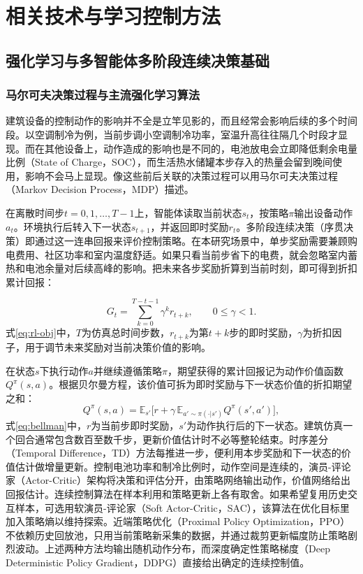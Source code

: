 \chapter{相关技术与学习控制方法}

\section{强化学习与多智能体多阶段连续决策基础}
\subsection{马尔可夫决策过程与主流强化学习算法}
建筑设备的控制动作的影响并不全是立竿见影的，而且经常会影响后续的多个时间段。以空调制冷为例，当前步调小空调制冷功率，室温升高往往隔几个时段才显现。而在其他设备上，动作造成的影响也是不同的，电池放电会立即降低剩余电量比例（State of Charge，SOC），而生活热水储罐本步存入的热量会留到晚间使用，影响不会马上显现。像这些前后关联的决策过程可以用马尔可夫决策过程（Markov Decision Process，MDP）描述\cite{sutton2018}。

在离散时间步$t=0,1,\dots,T-1$上，智能体读取当前状态$s_t$，按策略$\pi$输出设备动作$a_t$。环境执行后转入下一状态$s_{t+1}$，并返回即时奖励$r_t$。多阶段连续决策（序贯决策）即通过这一连串回报来评价控制策略\cite{powell2022}。在本研究场景中，单步奖励需要兼顾购电费用、社区功率和室内温度舒适。如果只看当前步省下的电费，就会忽略室内蓄热和电池余量对后续高峰的影响。把未来各步奖励折算到当前时刻，即可得到折扣累计回报：

\begin{equation}
    \label{eq:rl-obj}
    G_t=\sum_{k=0}^{T-t-1}\gamma^k r_{t+k},\qquad 0\leq\gamma<1 .
\end{equation}
式\eqref{eq:rl-obj}中，$T$为仿真总时间步数，$r_{t+k}$为第$t+k$步的即时奖励，$\gamma$为折扣因子，用于调节未来奖励对当前决策价值的影响。

在状态$s$下执行动作$a$并继续遵循策略$\pi$，期望获得的累计回报记为动作价值函数$Q^{\pi}(s,a)$。根据贝尔曼方程，该价值可拆为即时奖励与下一状态价值的折扣期望之和：
\begin{equation}
    \label{eq:bellman}
    Q^{\pi}(s,a)=\mathbb{E}_{s'}\Big[r+\gamma\,\mathbb{E}_{a'\sim\pi(\cdot|s')}Q^{\pi}(s',a')\Big],
\end{equation}
式\eqref{eq:bellman}中，$r$为当前步即时奖励，$s'$为动作执行后的下一状态。建筑仿真一个回合通常包含数百至数千步，更新价值估计时不必等整轮结束。时序差分（Temporal Difference，TD）方法每推进一步，便利用本步奖励和下一状态的价值估计做增量更新。控制电池功率和制冷比例时，动作空间是连续的，演员-评论家（Actor-Critic）架构将决策和评估分开，由策略网络输出动作，价值网络给出回报估计。连续控制算法在样本利用和策略更新上各有取舍。如果希望复用历史交互样本，可选用软演员-评论家（Soft Actor-Critic，SAC），该算法在优化目标里加入策略熵以维持探索\cite{haarnoja2018}。近端策略优化（Proximal Policy Optimization，PPO）不依赖历史回放池，只用当前策略新采集的数据，并通过裁剪更新幅度防止策略剧烈波动\cite{ppo2017}。上述两种方法均输出随机动作分布，而深度确定性策略梯度（Deep Deterministic Policy Gradient，DDPG）直接给出确定的连续控制值\cite{sumiea2024}。

